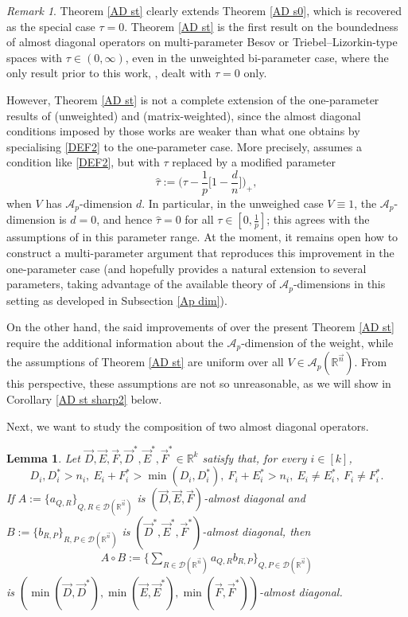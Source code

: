 \documentclass[11pt, reqno]{amsart}
\newtheorem{lemma}[theorem]{Lemma}
\theoremstyle{definition}
\theoremstyle{remark}
\newtheorem{remark}[theorem]{Remark}
\numberwithin{equation}{section}
\newcommand{\A}{\mathscr A}
\newcommand{\R}{\mathbb R}
\newcommand{\vn}{\vec n}
\begin{document}
\begin{remark}\label{rem AD st}
Theorem \ref{AD st} clearly extends Theorem \ref{AD s0}, which is recovered as the special case $\tau=0$. Theorem \ref{AD st} is the first result on the boundedness of almost diagonal operators on multi-parameter Besov or Triebel--Lizorkin-type spaces with $\tau\in(0,\infty)$, even in the unweighted bi-parameter case, where the only result prior to this work, \cite[Theorem 5.2]{GKP21}, dealt with $\tau=0$ only.

However, Theorem \ref{AD st} is not a complete extension of the one-parameter results of \cite{YY10} (unweighted) and \cite{BHYY:1b} (matrix-weighted), since the almost diagonal conditions imposed by those works are weaker than what one obtains by specialising \eqref{DEF2} to the one-parameter case. More precisely, \cite[Theorem 5.1]{BHYY:1b} assumes a condition like \eqref{DEF2}, but with $\tau$ replaced by a modified parameter
\begin{equation*}
\widehat\tau:=\Big(\tau-\frac{1}{p}\Big[1-\frac{d}{n}\Big]\Big)_+,
\end{equation*}
when $V$ has $\A_p$-dimension $d$. In particular, in the unweighed case $V\equiv 1$, the $\A_p$-dimension is $d=0$, and hence $\widehat\tau=0$ for all $\tau\in[0,\frac{1}{p}]$; this agrees with the assumptions of \cite[Theorem 4.1]{YY10} in this parameter range. At the moment, it remains open how to construct a multi-parameter argument that reproduces this improvement in the one-parameter case (and hopefully provides a natural extension to several parameters, taking advantage of the available theory of $\A_p$-dimensions in this setting as developed in Subsection \ref{Ap dim}).

On the other hand, the said improvements of \cite[Theorem 5.1]{BHYY:1b} over the present Theorem \ref{AD st} require the additional information about the $\A_p$-dimension of the weight, while the assumptions of Theorem \ref{AD st} are uniform over all $V\in\A_p(\R^{\vn})$. From this perspective, these assumptions are not so unreasonable, as we will show in Corollary \ref{AD st sharp2} below.
\end{remark}

Next, we want to study the composition of two almost diagonal operators.

\begin{lemma}\label{AcB}
Let $\vec D,\vec E,\vec F,\vec D^*,\vec E^*,\vec F^*\in\R^k$
satisfy that, for every $i\in[k]$,
$$
D_i,D^*_i>n_i,\
E_i+F^*_i>\min(D_i, D^*_i),\
F_i+E^*_i>n_i,\
E_i\neq E^*_i,\
F_i\neq F^*_i.
$$
If $A:=\{a_{Q,R}\}_{Q,R\in\mathscr{D}(\mathbb R^{\vec n})}$
is $(\vec D,\vec E,\vec F)$-almost diagonal
and $B:=\{b_{R,P}\}_{R,P\in\mathscr{D}(\mathbb R^{\vec n})}$ is
$(\vec D^*,\vec E^*,\vec F^*)$-almost diagonal, then
\begin{align*}
A\circ B:=\Bigg\{\sum_{R\in\mathscr{D}(\mathbb R^{\vec n})}
a_{Q,R}b_{R,P}\Bigg\}_{Q,P\in\mathscr{D}(\mathbb R^{\vec n})}
\end{align*}
is $(\min(\vec D,\vec D^*),\min(\vec E,\vec E^*),\min(\vec F,\vec F^*))$-almost diagonal.
\end{lemma}
\end{document}
